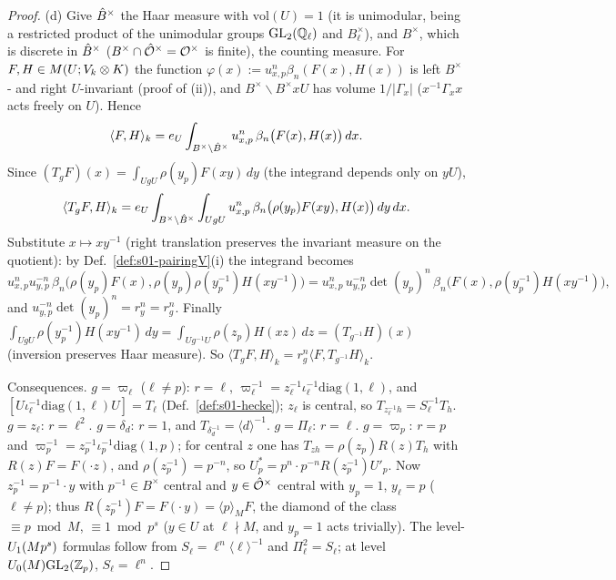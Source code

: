 \begin{proof}
(d) Give $\hat{B}^\times$ the Haar measure with $\mathrm{vol}(U)=1$ (it is unimodular, being a restricted product of the unimodular groups
$\mathrm{GL}_2(\mathbb{Q}_\ell)$ and $B_\ell^\times$), and $B^\times$, which is discrete in $\hat{B}^\times$ ($B^\times\cap\hat{\mathcal{O}}^\times=\mathcal{O}^\times$ is finite), the counting
measure. For $F,H\in M(U;V_k\otimes K)$ the function $\varphi(x):=u_{x,p}^n\beta_n(F(x),H(x))$ is left $B^\times$- and right $U$-invariant (proof
of (ii)), and $B^\times\backslash B^\times xU$ has volume $1/|\Gamma_x|$ ($x^{-1}\Gamma_xx$ acts freely on $U$). Hence
\[\langle F,H\rangle_k=e_U\int_{B^\times\backslash\hat{B}^\times}u_{x,p}^n\,\beta_n\big(F(x),H(x)\big)\,dx .\]
Since $(T_gF)(x)=\int_{UgU}\rho(y_p)F(xy)\,dy$ (the integrand depends only on $yU$),
\[\langle T_gF,H\rangle_k=e_U\int_{B^\times\backslash\hat{B}^\times}\int_{UgU}u_{x,p}^n\,\beta_n\big(\rho(y_p)F(xy),H(x)\big)\,dy\,dx .\]
Substitute $x\mapsto xy^{-1}$ (right translation preserves the invariant measure on the quotient): by
Def.~\ref{def:s01-pairingV}(i) the integrand becomes
\[u_{x,p}^nu_{y,p}^{-n}\,\beta_n\big(\rho(y_p)F(x),\rho(y_p)\rho(y_p^{-1})H(xy^{-1})\big)
=u_{x,p}^n\,u_{y,p}^{-n}\det(y_p)^n\,\beta_n\big(F(x),\rho(y_p^{-1})H(xy^{-1})\big),\]
and $u_{y,p}^{-n}\det(y_p)^n=r_y^n=r_g^n$. Finally $\int_{UgU}\rho(y_p^{-1})H(xy^{-1})\,dy=\int_{Ug^{-1}U}\rho(z_p)H(xz)\,dz=(T_{g^{-1}}H)(x)$
(inversion preserves Haar measure). So $\langle T_gF,H\rangle_k=r_g^n\langle F,T_{g^{-1}}H\rangle_k$.

Consequences. $g=\varpi_\ell$ ($\ell\ne p$): $r=\ell$, $\varpi_\ell^{-1}=z_\ell^{-1}\iota_\ell^{-1}\mathrm{diag}(1,\ell)$, and
$[U\iota_\ell^{-1}\mathrm{diag}(1,\ell)U]=T_\ell$ (Def.~\ref{def:s01-hecke}); $z_\ell$ is central, so $T_{z_\ell^{-1}h}=S_\ell^{-1}T_h$. $g=z_\ell$: $r=\ell^2$.
$g=\delta_d$: $r=1$, and $T_{\delta_d^{-1}}=\langle d\rangle^{-1}$. $g=\Pi_\ell$: $r=\ell$. $g=\varpi_p$: $r=p$ and
$\varpi_p^{-1}=z_p^{-1}\iota_p^{-1}\mathrm{diag}(1,p)$; for central $z$ one has $T_{zh}=\rho(z_p)R(z)T_h$ with $R(z)F=F(\cdot z)$, and $\rho(z_p^{-1})=p^{-n}$, so
$U_p^*=p^n\cdot p^{-n}R(z_p^{-1})U'_p$. Now $z_p^{-1}=p^{-1}\cdot y$ with $p^{-1}\in B^\times$ central and $y\in\hat{\mathcal{O}}^\times$ central with $y_p=1$, $y_\ell=p$
($\ell\ne p$); thus $R(z_p^{-1})F=F(\cdot\,y)=\langle p\rangle_MF$, the diamond of the class $\equiv p\bmod M$, $\equiv1\bmod p^s$ ($y\in U$ at $\ell\nmid M$, and
$y_p=1$ acts trivially). The level-$U_1(Mp^s)$ formulas follow from $S_\ell=\ell^n\langle\ell\rangle^{-1}$ and $\Pi_\ell^2=S_\ell$; at level
$U_0(M)\mathrm{GL}_2(\mathbb{Z}_p)$, $S_\ell=\ell^n$.
\end{proof}

